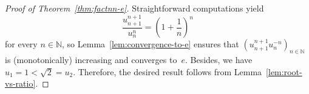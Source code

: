\documentclass[12pt,a4paper]{article}
\newcommand{\bN}{\mathbb{N}}
\begin{document}
\begin{proof}[Proof of Theorem~\ref{thm:factnn-e}]
  Straightforward computations yield
  $$
  \frac{u_{n + 1}^{n + 1}}{u_n^n} 
  = \left(1 + \frac{1}{n} \right)^n  
  $$
  for every $n \in \bN$,
  so Lemma~\ref{lem:convergence-to-e} ensures that 
  $\left( u_{n + 1}^{n + 1} u_n^{- n} \right)_{n \in \bN}$ is (monotonically) increasing and converges to~$e$.
  Besides, we have $u_1 = 1 < \sqrt{2} = u_2$.
  Therefore, the desired result follows from Lemma~\ref{lem:root-vs-ratio}.
\end{proof} 




\end{document}
